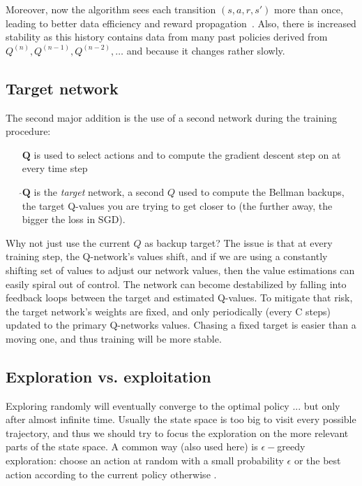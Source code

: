 \documentclass{tufte-handout}
\begin{document}
Moreover, now the algorithm sees each transition $(s,a,r,s')$ more than once, leading to better data efficiency and reward propagation~. Also, there is increased stability as this history contains data from many past policies derived from  $Q^{(n)},Q^{(n-1)},Q^{(n-2)}, \ldots$ and because it changes rather slowly. 

\subsection{Target network}
The second major addition is the use of a second network during the training procedure:
\begin{itemize}
  \item[$\mathbf{Q}$] is used to select actions and to compute the gradient descent step on at every time step
  \item[$\mathbf{\hat{}Q}$] is the \emph{target} network, a second $Q$ used to compute the Bellman backups, the target Q-values you are trying to get closer to (the further away, the bigger the loss in SGD).
\end{itemize}

Why not just use the current $Q$ as backup target? The issue is that at every training step, the Q-network's values shift, and if we are using a constantly shifting set of values to adjust our network values, then the value estimations can easily spiral out of control. The network can become destabilized by falling into feedback loops between the target and estimated Q-values. To mitigate that risk, the target network's weights are fixed, and only periodically (every C steps) updated to the primary Q-networks values. Chasing a fixed target is easier than a moving one, and thus training will be more stable. 

\subsection{Exploration vs. exploitation}
Exploring randomly will eventually converge to the optimal policy ... but only after almost infinite time. Usually the state space is too big to visit every possible trajectory, and thus we should try to focus the exploration on the more relevant parts of the state space. A common way (also used here) is $\epsilon-$greedy exploration: choose an action at random with a small probability $\epsilon$ or the best action according to the current policy otherwise . 
\end{document}
